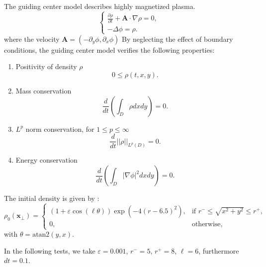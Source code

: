 \documentclass[proc]{edpsmath}
\begin{document}
The guiding center model describes highly magnetized plasma.
\begin{equation}
\left\{
\begin{array}{l}
 \frac{\partial \rho}{\partial t}+\mathbf{A}\cdot\nabla\rho=0,\\[3mm]
 -\Delta\phi=\rho.
\end{array}
\right.
   \label{eq:guiding_center}
  \end{equation}
where the velocity $\mathbf{A} = (-\partial_y\phi, \partial_x\phi)  $
By neglecting the effect of boundary conditions, the  guiding center model verifies the following properties:
\begin{enumerate}
 \item Positivity of density $\rho$
 \begin{equation*}
  0\leq\rho(t,x,y).  
 \end{equation*}
 \item Mass conservation
 \begin{equation*}
  \frac{d}{dt}\left(\int_{D}\rho dx dy\right)=0.
 \end{equation*}
 \item $L^p$ norm conservation, for $1\leq p\leq\infty$
 \begin{equation*}
  \frac{d}{dt}||\rho||_{L^p(D)}=0.
 \end{equation*}
\item Energy conservation
\begin{equation*}
 \frac{d}{dt}\left(\int_{D}|\nabla\phi|^2dx dy\right)=0.
\end{equation*}
\end{enumerate}

The initial density is given by :
\begin{equation*}
 \rho_0(\mathbf{x}_\bot)=
 \left\{
 \begin{array}{ll}
  (1+\varepsilon\cos(\ell\theta))\exp{(-4(r-6.5)^2)},&\text{if  } r^-\leq\sqrt{x^2+y^2}\leq r^+,\\[3mm]
  0,&\text{otherwise},
 \end{array}
 \right.
\end{equation*}
with $\theta=\text{atan2}(y,x)$.

\noindent In the following tests, we take $\varepsilon=0.001$, $r^-=5$, $r^+=8$, $\ell=6$, furthermore $dt=0.1$.\\ 
\end{document}
